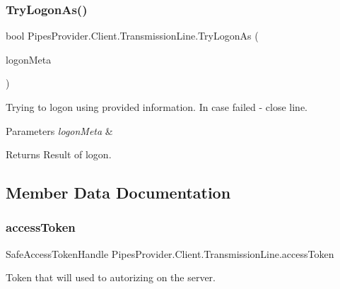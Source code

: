 \subsubsection{\texorpdfstring{Try\+Logon\+As()}{TryLogonAs()}}
{\footnotesize\ttfamily bool Pipes\+Provider.\+Client.\+Transmission\+Line.\+Try\+Logon\+As (\begin{DoxyParamCaption}\item[{\mbox{\hyperlink{struct_pipes_provider_1_1_security_1_1_logon_config}{Security.\+Logon\+Config}}}]{logon\+Meta }\end{DoxyParamCaption})}



Trying to logon using provided information. In case failed -\/ close line. 


\begin{DoxyParams}{Parameters}
{\em logon\+Meta} & \\
\hline
\end{DoxyParams}
\begin{DoxyReturn}{Returns}
Result of logon.
\end{DoxyReturn}


\subsection{Member Data Documentation}
\mbox{\label{class_pipes_provider_1_1_client_1_1_transmission_line_adad9bc543ae01a23e792f46bf3b3092f}} 
\subsubsection{\texorpdfstring{access\+Token}{accessToken}}
{\footnotesize\ttfamily Safe\+Access\+Token\+Handle Pipes\+Provider.\+Client.\+Transmission\+Line.\+access\+Token}



Token that will used to autorizing on the server. 

\mbox{\label{class_pipes_provider_1_1_client_1_1_transmission_line_ac58ee721ec6876da25190b15d52530a3}} 
